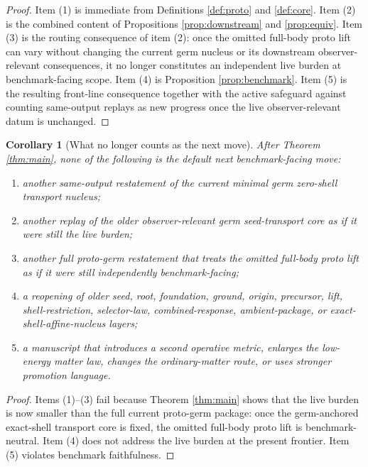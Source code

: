 \documentclass[11pt]{article}
\newtheorem{corollary}{Corollary}
\begin{document}
\begin{proof}
Item (1) is immediate from Definitions \ref{def:proto} and \ref{def:core}. Item (2) is the combined content of Propositions \ref{prop:downstream} and \ref{prop:equiv}. Item (3) is the routing consequence of item (2): once the omitted full-body proto lift can vary without changing the current germ nucleus or its downstream observer-relevant consequences, it no longer constitutes an independent live burden at benchmark-facing scope. Item (4) is Proposition \ref{prop:benchmark}. Item (5) is the resulting front-line consequence together with the active safeguard against counting same-output replays as new progress once the live observer-relevant datum is unchanged.
\end{proof}

\begin{corollary}[What no longer counts as the next move]
\label{cor:screened}
After Theorem \ref{thm:main}, none of the following is the default next benchmark-facing move:
\begin{enumerate}
    \item another same-output restatement of the current minimal germ zero-shell transport nucleus;
    \item another replay of the older observer-relevant germ seed-transport core as if it were still the live burden;
    \item another full proto-germ restatement that treats the omitted full-body proto lift as if it were still independently benchmark-facing;
    \item a reopening of older seed, root, foundation, ground, origin, precursor, lift, shell-restriction, selector-law, combined-response, ambient-package, or exact-shell-affine-nucleus layers;
    \item a manuscript that introduces a second operative metric, enlarges the low-energy matter law, changes the ordinary-matter route, or uses stronger promotion language.
\end{enumerate}
\end{corollary}

\begin{proof}
Items (1)--(3) fail because Theorem \ref{thm:main} shows that the live burden is now smaller than the full current proto-germ package: once the germ-anchored exact-shell transport core is fixed, the omitted full-body proto lift is benchmark-neutral. Item (4) does not address the live burden at the present frontier. Item (5) violates benchmark faithfulness.
\end{proof}
\end{document}

